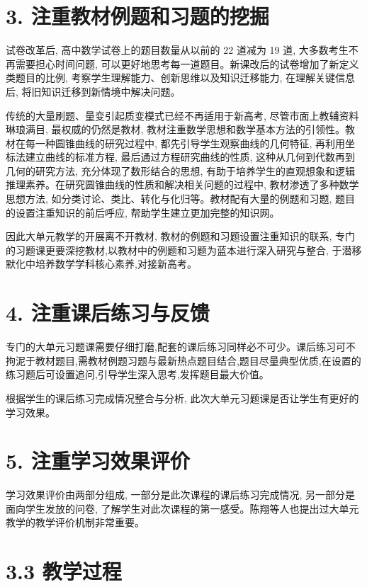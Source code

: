 \documentclass[10pt]{article}
\begin{document}
\section*{3. 注重教材例题和习题的挖掘}

试卷改革后, 高中数学试卷上的题目数量从以前的 22 道减为 19 道, 大多数考生不再需要担心时间问题, 可以更好地思考每一道题目。新课改后的试卷增加了新定义类题目的比例, 考察学生理解能力、创新思维以及知识迁移能力, 在理解关键信息后, 将旧知识迁移到新情境中解决问题。

传统的大量刷题、量变引起质变模式已经不再适用于新高考, 尽管市面上教辅资料琳琅满目, 最权威的仍然是教材, 教材注重数学思想和数学基本方法的引领性。教材在每一种圆锥曲线的研究过程中, 都先引导学生观察曲线的几何特征, 再利用坐标法建立曲线的标准方程, 最后通过方程研究曲线的性质, 这种从几何到代数再到几何的研究方法, 充分体现了数形结合的思想, 有助于培养学生的直观想象和逻辑推理素养。在研究圆锥曲线的性质和解决相关问题的过程中, 教材渗透了多种数学思想方法, 如分类讨论、类比、转化与化归等。教材配有大量的例题和习题, 题目的设置注重知识的前后呼应, 帮助学生建立更加完整的知识网。

因此大单元教学的开展离不开教材, 教材的例题和习题设置注重知识的联系, 专门的习题课更要深挖教材,以教材中的例题和习题为蓝本进行深入研究与整合, 于潜移默化中培养数学学科核心素养,对接新高考。

\section*{4. 注重课后练习与反馈}

专门的大单元习题课需要仔细打磨,配套的课后练习同样必不可少。课后练习可不拘泥于教材题目,需教材例题习题与最新热点题目结合,题目尽量典型优质,在设置的练习题后可设置追问,引导学生深入思考,发挥题目最大价值。

根据学生的课后练习完成情况整合与分析, 此次大单元习题课是否让学生有更好的学习效果。

\section*{5. 注重学习效果评价}

学习效果评价由两部分组成, 一部分是此次课程的课后练习完成情况, 另一部分是面向学生发放的问卷, 了解学生对此次课程的第一感受。陈翔等人也提出过大单元教学的教学评价机制非常重要。

\section*{3.3 教学过程}
\end{document}
